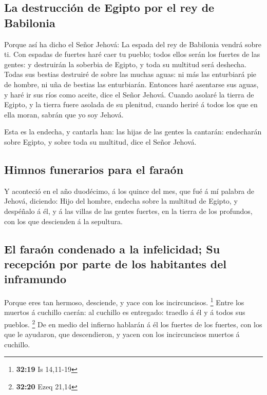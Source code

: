 \hypertarget{la-destrucciuxf3n-de-egipto-por-el-rey-de-babilonia}{%
\subsection{La destrucción de Egipto por el rey de
Babilonia}\label{la-destrucciuxf3n-de-egipto-por-el-rey-de-babilonia}}

 Porque así ha dicho el Señor Jehová: La espada del rey de
Babilonia vendrá sobre ti.  Con espadas de fuertes haré
caer tu pueblo; todos ellos serán los fuertes de las gentes: y
destruirán la soberbia de Egipto, y toda su multitud será deshecha.
 Todas sus bestias destruiré de sobre las muchas aguas: ni
más las enturbiará pie de hombre, ni uña de bestias las enturbiarán.
 Entonces haré asentarse sus aguas, y haré ir sus ríos como
aceite, dice el Señor Jehová.  Cuando asolaré la tierra de
Egipto, y la tierra fuere asolada de su plenitud, cuando heriré á todos
los que en ella moran, sabrán que yo soy Jehová.

 Esta es la endecha, y cantarla han: las hijas de las
gentes la cantarán: endecharán sobre Egipto, y sobre toda su multitud,
dice el Señor Jehová.

\hypertarget{himnos-funerarios-para-el-farauxf3n}{%
\subsection{Himnos funerarios para el
faraón}\label{himnos-funerarios-para-el-farauxf3n}}

 Y aconteció en el año duodécimo, á los quince del mes, que
fué á mí palabra de Jehová, diciendo:  Hijo del hombre,
endecha sobre la multitud de Egipto, y despéñalo á él, y á las villas de
las gentes fuertes, en la tierra de los profundos, con los que
descienden á la sepultura.

\hypertarget{el-farauxf3n-condenado-a-la-infelicidad-su-recepciuxf3n-por-parte-de-los-habitantes-del-inframundo}{%
\subsection{El faraón condenado a la infelicidad; Su recepción por parte
de los habitantes del
inframundo}\label{el-farauxf3n-condenado-a-la-infelicidad-su-recepciuxf3n-por-parte-de-los-habitantes-del-inframundo}}

 Porque eres tan hermoso, desciende, y yace con los
incircuncisos. \footnote{\textbf{32:19} Is 14,11-19}  Entre
los muertos á cuchillo caerán: al cuchillo es entregado: traedlo á él y
á todos sus pueblos. \footnote{\textbf{32:20} Ezeq 21,14} 
De en medio del infierno hablarán á él los fuertes de los fuertes, con
los que le ayudaron, que descendieron, y yacen con los incircuncisos
muertos á cuchillo.

